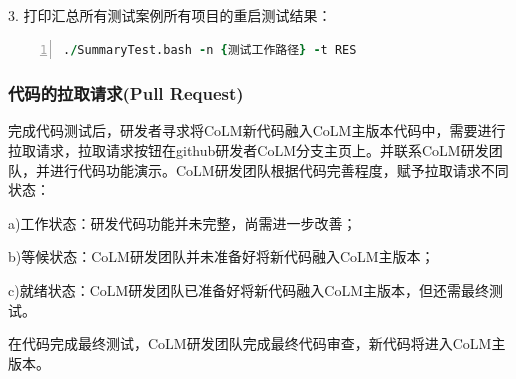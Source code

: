 3. 打印汇总所有测试案例所有项目的重启测试结果：

\begin{lstlisting}[language=fortran, basicstyle=\linespread{1.0}\footnotesize\ttfamily, commentstyle=\color{olive}, numbers=left, numberstyle=\tiny, xleftmargin=1.5em,xrightmargin=0em, aboveskip=1em]
   ./SummaryTest.bash -n {测试工作路径} -t RES
\end{lstlisting}


\subsubsection{代码的拉取请求(Pull Request)}

完成代码测试后，研发者寻求将CoLM新代码融入CoLM主版本代码中，需要进行拉取请求，拉取请求按钮在github研发者CoLM分支主页上。并联系CoLM研发团队，并进行代码功能演示。CoLM研发团队根据代码完善程度，赋予拉取请求不同状态：

a)工作状态：研发代码功能并未完整，尚需进一步改善；

b)等候状态：CoLM研发团队并未准备好将新代码融入CoLM主版本；

c)就绪状态：CoLM研发团队已准备好将新代码融入CoLM主版本，但还需最终测试。

在代码完成最终测试，CoLM研发团队完成最终代码审查，新代码将进入CoLM主版本。
